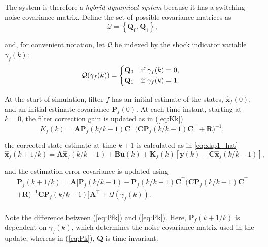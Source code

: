 The system is therefore a \textit{hybrid dynamical system} because it has a switching noise covariance matrix. Define the set of possible covariance matrices as
\begin{equation} \label{eq:init_Q_R}
	\mathcal{Q} = \left\{\mathbf{Q}_0, \mathbf{Q}_1\right\},
\end{equation}

and, for convenient notation, let $\mathcal{Q}$ be indexed by the shock indicator variable $\gamma_f(k)$:
\begin{equation} \label{eq:init_Q}
	\mathcal{Q}(\gamma_f(k)) = 
	\begin{cases*}
		\mathbf{Q}_0 & if $\gamma_f(k)=0$, \\
		\mathbf{Q}_1 & if $\gamma_f(k)=1$.
	\end{cases*}
\end{equation}

At the start of simulation, filter $f$ has an initial estimate of the states, $\mathbf{\hat{x}}_f(0)$, and an initial estimate covariance $\mathbf{P}_f(0)$. At each time instant, starting at $k=0$, the filter correction gain is updated as in (\ref{eq:Kk})
\begin{equation} \label{eq:Kf}
	K_f(k) = \mathbf{A}\mathbf{P}_f(k/k-1)\mathbf{C}^\intercal \big(\mathbf{C}\mathbf{P}_f(k/k-1)\mathbf{C}^\intercal + \mathbf{R}\big)^{-1},
\end{equation}

the corrected state estimate at time $k+1$ is calculated as in \ref{eq:xkp1_hat}
\begin{equation} \label{eq:xfkp1_hat}
	\mathbf{\hat{x}}_f(k+1/k) = \mathbf{A} \mathbf{\hat{x}}_f(k/k-1) + \mathbf{B}\mathbf{u}(k) + 
	\mathbf{K}_f(k)\left[\mathbf{y}(k)-\mathbf{C} \mathbf{\hat{x}}_f(k/k-1)\right],
\end{equation}

and the estimation error covariance is updated using
\begin{multline} \label{eq:Pfk}
	\mathbf{P}_f(k+1/k) = \mathbf{A}\big[\mathbf{P}_f(k/k-1)
	- \mathbf{P}_f(k/k-1)\mathbf{C}^\intercal\big(\mathbf{C}\mathbf{P}_f(k/k-1)\mathbf{C}^\intercal \\ + 
	\mathbf{R}\big)^{-1}\mathbf{C}\mathbf{P}_f(k/k-1) \big]\mathbf{A}^\intercal + \mathcal{Q}(\gamma_f(k)). \\
\end{multline}

Note the difference between (\ref{eq:Pfk}) and (\ref{eq:Pk}).  Here, $\mathbf{P}_f(k+1/k)$ is dependent on $\gamma_f(k)$, which determines the noise covariance matrix used in the update, whereas in (\ref{eq:Pk}), $\mathbf{Q}$ is time invariant.

